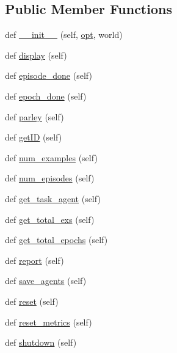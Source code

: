 \subsection*{Public Member Functions}
\begin{DoxyCompactItemize}
\item 
def \hyperlink{classparlai_1_1core_1_1worlds_1_1HogwildWorld_a99acf6286bf07b0967979dd134768cd8}{\+\_\+\+\_\+init\+\_\+\+\_\+} (self, \hyperlink{classparlai_1_1core_1_1worlds_1_1World_a3640d92718acd3e6942a28c1ab3678bd}{opt}, world)
\item 
def \hyperlink{classparlai_1_1core_1_1worlds_1_1HogwildWorld_a1b7aed0a7b56712f22ee8b04c65d7c00}{display} (self)
\item 
def \hyperlink{classparlai_1_1core_1_1worlds_1_1HogwildWorld_a0425099fbc33cb97d6fbe67dbd2e8a1f}{episode\+\_\+done} (self)
\item 
def \hyperlink{classparlai_1_1core_1_1worlds_1_1HogwildWorld_ae80d3f592818ac39b9cf8802270d8d8a}{epoch\+\_\+done} (self)
\item 
def \hyperlink{classparlai_1_1core_1_1worlds_1_1HogwildWorld_a9853e25a58444d4516c3f6da8c44d9c2}{parley} (self)
\item 
def \hyperlink{classparlai_1_1core_1_1worlds_1_1HogwildWorld_a67379773119cebd6ac70fce2abcb19a9}{get\+ID} (self)
\item 
def \hyperlink{classparlai_1_1core_1_1worlds_1_1HogwildWorld_ae488971481ec6c8ba803b2404ad70e56}{num\+\_\+examples} (self)
\item 
def \hyperlink{classparlai_1_1core_1_1worlds_1_1HogwildWorld_ae0b4dc3d2bb4d1dbda7970da03da1a6e}{num\+\_\+episodes} (self)
\item 
def \hyperlink{classparlai_1_1core_1_1worlds_1_1HogwildWorld_a7dfc60f5229da37574c31479a0b2ce3a}{get\+\_\+task\+\_\+agent} (self)
\item 
def \hyperlink{classparlai_1_1core_1_1worlds_1_1HogwildWorld_a0e26cfad1c63628cb43f554c470426b9}{get\+\_\+total\+\_\+exs} (self)
\item 
def \hyperlink{classparlai_1_1core_1_1worlds_1_1HogwildWorld_a6bc364b91906b14d792957c8eeed5206}{get\+\_\+total\+\_\+epochs} (self)
\item 
def \hyperlink{classparlai_1_1core_1_1worlds_1_1HogwildWorld_a11c6831feb2a54a0d9513b4a514d4097}{report} (self)
\item 
def \hyperlink{classparlai_1_1core_1_1worlds_1_1HogwildWorld_a1f7e4c566078aebdb5e837c6fed62b17}{save\+\_\+agents} (self)
\item 
def \hyperlink{classparlai_1_1core_1_1worlds_1_1HogwildWorld_ae72983e6af34391880979491ced1dde6}{reset} (self)
\item 
def \hyperlink{classparlai_1_1core_1_1worlds_1_1HogwildWorld_ae57e2b90771c0feaa0496cb2885eae6d}{reset\+\_\+metrics} (self)
\item 
def \hyperlink{classparlai_1_1core_1_1worlds_1_1HogwildWorld_a3960deb08a179884b1eea2e423437db2}{shutdown} (self)
\end{DoxyCompactItemize}

